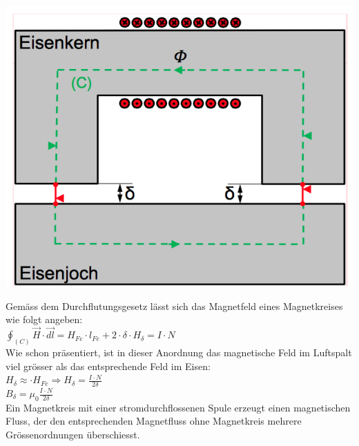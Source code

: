 \begin{minipage}{0.4 \linewidth}
\includegraphics[width = \linewidth]{./Pics/VL2/magKreis}
\end{minipage}
\begin{minipage}{0.6 \linewidth}
Gemäss dem Durchflutungsgesetz lässt sich das Magnetfeld eines Magnetkreises wie folgt angeben: \\

$\oint_{(C)} \vec{H} \cdot \vec{dl} = H_{Fe} \cdot l_{Fe} + 2 \cdot \delta \cdot H_{\delta}  = I \cdot N $ \\

Wie schon präsentiert, ist in dieser Anordnung das magnetische Feld im Luftspalt viel grösser als das entsprechende Feld im Eisen: \\

$H_{\delta} \approx \cdot H_{Fe} \Rightarrow H_{\delta} = \frac{I \cdot N}{2 \delta} $ \\

$B_{\delta} = \mu_0 \frac{I \cdot N}{2 \delta} $ \\

Ein Magnetkreis mit einer stromdurchflossenen Spule erzeugt einen magnetischen Fluss, der den entsprechenden Magnetfluss ohne Magnetkreis mehrere Grössenordnungen überschiesst. 
\end{minipage}


